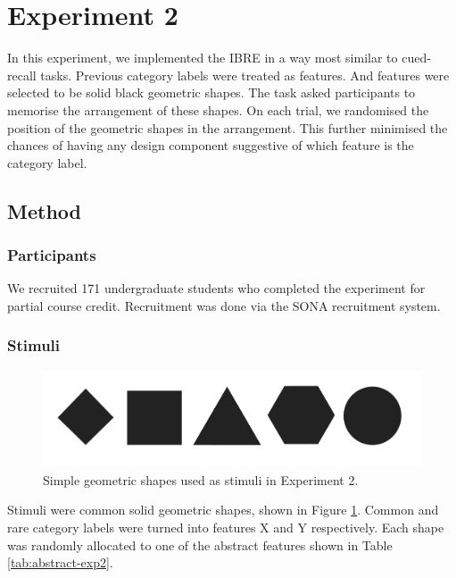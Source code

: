 \documentclass[10pt,letterpaper]{article}
\begin{document}
\section{Experiment 2}

In this experiment, we implemented the IBRE in a way most similar to cued-recall tasks.
Previous category labels were treated as features.
And features were selected to be solid black geometric shapes.
The task asked participants to memorise the arrangement of these shapes.
On each trial, we randomised the position of the geometric shapes in the arrangement.
This further minimised the chances of having any design component suggestive of which feature is the category label.

\subsection{Method}

\subsubsection{Participants}

We recruited 171 undergraduate students who completed the experiment for partial course credit.
Recruitment was done via the SONA recruitment system. \\

\subsubsection{Stimuli}

\begin{figure}
  \begin{center}
    \caption{Simple geometric shapes used as stimuli in Experiment 2.}
    \label{figure:exp2-stimuli}
    \includegraphics[scale=0.15]{figures/experiment_2_stimuli.pdf}
  \end{center}
\end{figure}

Stimuli were common solid geometric shapes, shown in Figure \ref*{figure:exp2-stimuli}.
Common and rare category labels were turned into features X and Y respectively.
Each shape was randomly allocated to one of the abstract features shown in Table \ref*{tab:abstract-exp2}.
\end{document}

